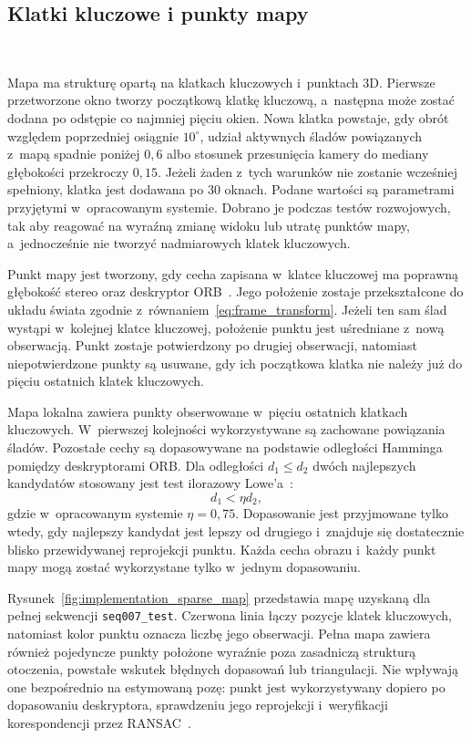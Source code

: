 \subsection{Klatki kluczowe i punkty mapy}\
\label{subsec}

Mapa ma strukturę opartą na klatkach kluczowych i~punktach 3D. Pierwsze przetworzone okno tworzy początkową klatkę kluczową, a~następna może zostać dodana po odstępie co najmniej pięciu okien. Nowa klatka powstaje, gdy obrót względem poprzedniej osiągnie $10^\circ$, udział aktywnych śladów powiązanych z~mapą spadnie poniżej $0{,}6$ albo stosunek przesunięcia kamery do mediany głębokości przekroczy $0{,}15$. Jeżeli żaden z~tych warunków nie zostanie wcześniej spełniony, klatka jest dodawana po 30 oknach. Podane wartości są parametrami przyjętymi w~opracowanym systemie. Dobrano je podczas testów rozwojowych, tak aby reagować na wyraźną zmianę widoku lub utratę punktów mapy, a~jednocześnie nie tworzyć nadmiarowych klatek kluczowych.

Punkt mapy jest tworzony, gdy cecha zapisana w~klatce kluczowej ma poprawną głębokość stereo oraz deskryptor ORB~\cite{rublee2011orb}. Jego położenie zostaje przekształcone do układu świata zgodnie z~równaniem~\eqref{eq:frame_transform}. Jeżeli ten sam ślad wystąpi w~kolejnej klatce kluczowej, położenie punktu jest uśredniane z~nową obserwacją. Punkt zostaje potwierdzony po drugiej obserwacji, natomiast niepotwierdzone punkty są usuwane, gdy ich początkowa klatka nie należy już do pięciu ostatnich klatek kluczowych.

Mapa lokalna zawiera punkty obserwowane w~pięciu ostatnich klatkach kluczowych. W~pierwszej kolejności wykorzystywane są zachowane powiązania śladów. Pozostałe cechy są dopasowywane na podstawie odległości Hamminga pomiędzy deskryptorami ORB. Dla odległości $d_1\leq d_2$ dwóch najlepszych kandydatów stosowany jest test ilorazowy Lowe'a~\cite{lowe2004distinctive}:
\begin{equation}
    d_1<\eta d_2,
    \label{eq:implementation_descriptor_ratio}
\end{equation}
gdzie w~opracowanym systemie $\eta=0{,}75$. Dopasowanie jest przyjmowane tylko wtedy, gdy najlepszy kandydat jest lepszy od drugiego i~znajduje się dostatecznie blisko przewidywanej reprojekcji punktu. Każda cecha obrazu i~każdy punkt mapy mogą zostać wykorzystane tylko w~jednym dopasowaniu.

Rysunek~\ref{fig:implementation_sparse_map} przedstawia mapę uzyskaną dla pełnej sekwencji \texttt{seq007\_test}. Czerwona linia łączy pozycje klatek kluczowych, natomiast kolor punktu oznacza liczbę jego obserwacji. Pełna mapa zawiera również pojedyncze punkty położone wyraźnie poza zasadniczą strukturą otoczenia, powstałe wskutek błędnych dopasowań lub triangulacji. Nie wpływają one bezpośrednio na estymowaną pozę: punkt jest wykorzystywany dopiero po dopasowaniu deskryptora, sprawdzeniu jego reprojekcji i~weryfikacji korespondencji przez RANSAC~\cite{fischler1981ransac}.

